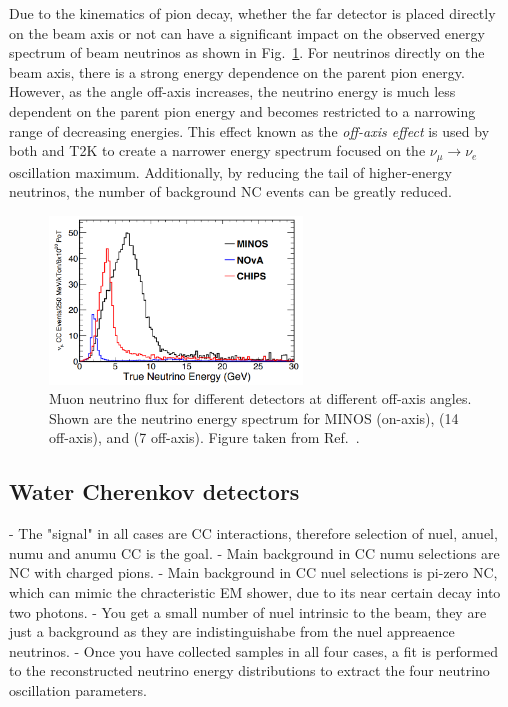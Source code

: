 Due to the kinematics of pion decay, whether the far detector is placed directly on the beam axis
or not can have a significant impact on the observed energy spectrum of beam neutrinos as shown in
Fig.~\ref{fig:numi_axis}. For neutrinos directly on the beam axis, there is a strong energy
dependence on the parent pion energy. However, as the angle off-axis increases, the neutrino
energy is much less dependent on the parent pion energy and becomes restricted to a narrowing
range of decreasing energies. This effect known as the \emph{off-axis effect} is used by both
\nova and T2K to create a narrower energy spectrum focused on the $\nu_{\mu}\rightarrow\nu_{e}$
oscillation maximum. Additionally, by reducing the tail of higher-energy neutrinos, the number of
background NC events can be greatly reduced.

\begin{figure} %
    \includegraphics[width=0.6\textwidth]{diagrams/4-chips/numi_axis.png}
    \caption[Muon neutrino flux for different \numi detectors at different off-axis angles.]
    {Muon neutrino flux for different \numi detectors at different off-axis angles. Shown are the
        neutrino energy spectrum for MINOS (on-axis), \nova (\unit{14}{} off-axis), and
        \chipsfive (\unit{7}{} off-axis). Figure taken from Ref.~\cite{adamson2013}.}
    \label{fig:numi_axis}
\end{figure}

\subsection{Water Cherenkov detectors} %
\label{sec:chips_concept_cherenkov} %

- The "signal" in all cases are CC interactions, therefore selection of nuel, anuel, numu and
anumu CC is the goal.
- Main background in CC numu selections are NC with charged pions.
- Main background in CC nuel selections is pi-zero NC, which can mimic the chracteristic EM
shower, due to its near certain decay into two photons.
- You get a small number of nuel intrinsic to the beam, they are just a background as they are
indistinguishabe from the nuel appreaence neutrinos.
- Once you have collected samples in all four cases, a fit is performed to the reconstructed
neutrino energy distributions to extract the four neutrino oscillation parameters.

